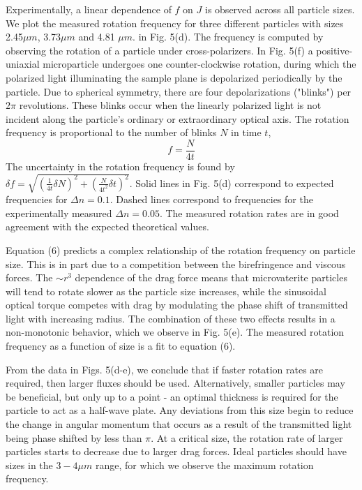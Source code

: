 \documentclass[12pt]{article}
\begin{document}
{Experimentally, a linear dependence of $f$ on
$J$ is observed across all particle sizes. We plot the measured rotation frequency for three different particles with sizes 2.45$\mu m$, 3.73$\mu m$ and
4.81 $\mu m.$ in Fig. 5(d).  The frequency is computed by observing
the rotation of a particle under cross-polarizers. In Fig. 5(f) a positive-uniaxial microparticle undergoes one counter-clockwise rotation, during which the polarized light illuminating the sample plane is depolarized periodically by the particle. Due to spherical symmetry, there are four depolarizations ("blinks")
per $2\pi$ revolutions. These blinks occur when the linearly polarized light is not incident
along the particle's ordinary or extraordinary optical
axis. The rotation frequency is proportional to the number of blinks
$N$ in time $t$,
\begin{equation}
f=\frac{N}{4t}
\end{equation}
The uncertainty in the rotation frequency is found by $\delta f=\sqrt{(\frac{1}{4t}\delta N)^{2}+(\frac{N}{4t^{2}}\delta t)^{2}}$.
Solid lines in Fig. 5(d) correspond to expected frequencies for $\Delta n=0.1$. Dashed lines correspond to frequencies for the experimentally measured $\Delta n=0.05$. The measured rotation rates are in good agreement with the expected theoretical values. 

Equation (6) predicts a complex relationship of the rotation frequency on particle size. This is in part due to a competition between the birefringence and viscous forces. The $\sim r^{3}$ dependence of the drag force means that microvaterite particles will tend to rotate slower as the particle size increases, while the sinusoidal optical torque competes with drag by modulating the phase shift of transmitted light with increasing radius. The combination of these two effects results in a non-monotonic behavior, which we observe in Fig. 5(e). The measured rotation frequency as a function of size is a fit to equation (6).

From the data in Figs. 5(d-e),  we conclude that if faster rotation
rates are required, then larger fluxes should be used. Alternatively, smaller particles may be beneficial, but only up to a point - an optimal thickness is required for the particle to act as a half-wave plate. Any deviations from this size begin to reduce the change in angular momentum that occurs as a result of the transmitted light being phase shifted by less than $\pi$. At a critical size, the rotation rate of larger particles starts to decrease due to larger drag forces. Ideal particles should have sizes in the $3-4\mu m$ range, for which we observe the maximum rotation frequency.

}
\end{document}
